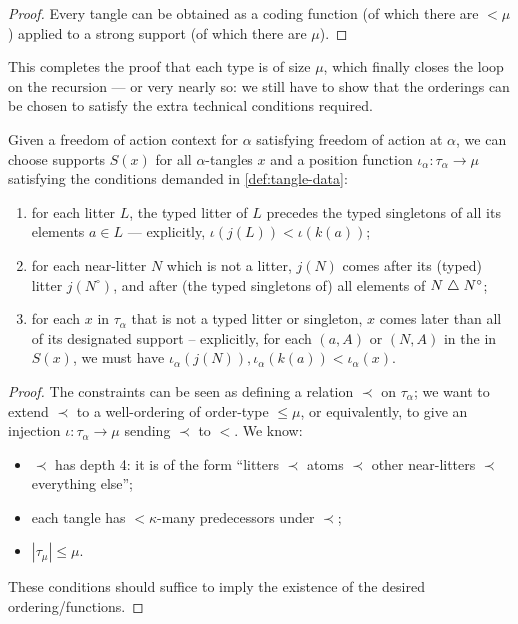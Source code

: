 \begin{proof}
  Every tangle can be obtained as a coding function (of which there are $<\mu$) applied to a strong support (of which there are $\mu$).
\end{proof}

This completes the proof that each type is of size $\mu$, which finally closes the loop on the recursion --- or very nearly so: we still have to show that the orderings can be chosen to satisfy the extra technical conditions required.

\begin{lemma}
  \label{lem:position-functions-propagate}
  Given a freedom of action context for $\alpha$ satisfying freedom of action at $\alpha$, we can choose supports $S(x)$ for all $\alpha$-tangles $x$ and a position function $\iota_\alpha : \tau_\alpha \to \mu$ satisfying the conditions demanded in \cref{def:tangle-data}:
  \begin{enumerate}
    \item for each litter $L$, the typed litter of $L$ precedes the typed singletons of all its elements $a \in L$ --- explicitly, $\iota(j(L)) < \iota(k(a))$;
    \item for each near-litter $N$ which is not a litter, $j(N)$ comes after its (typed) litter $j(N^\circ)$, and after (the typed singletons of) all elements of $N \mathrel{\triangle} N^\circ$;

    \item for each $x$ in $\tau_\alpha$ that is not a typed litter or singleton, $x$ comes later than all of its designated support -- explicitly, for each $(a,A)$ or $(N,A)$ in the in $S(x)$, we must have $\iota_\alpha(j(N)), \iota_\alpha(k(a))<\iota_\alpha(x)$.
  \end{enumerate}
\end{lemma}

\begin{proof}
  The constraints can be seen as defining a relation $\prec$ on $\tau_\alpha$; we want to extend $\prec$ to a well-ordering of order-type $\leq \mu$, or equivalently, to give an injection $\iota:\tau_\alpha \to \mu$ sending $\prec$ to $<$.  We know:
  \begin{itemize}
  \item $\prec$ has depth 4: it is of the form “litters $\prec$ atoms $\prec$ other near-litters $\prec$ everything else”;
  \item each tangle has $<\kappa$-many predecessors under $\prec$;
  \item $|\tau_\mu| \leq \mu$.
  \end{itemize}
  These conditions should suffice to imply the existence of the desired ordering/functions.
\end{proof}

